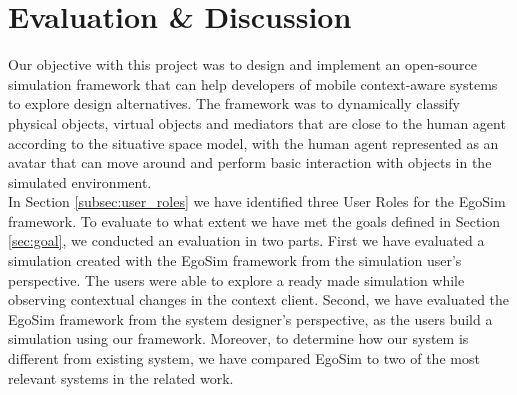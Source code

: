 \chapter{Evaluation \& Discussion}\label{ch:evaluation}
Our objective with this project was to design and implement an open-source simulation framework that can help developers of mobile context-aware systems to explore design alternatives. The framework was to dynamically classify physical objects, virtual objects and mediators that are close to the human agent according to the situative space model, with the human agent represented as an avatar that can move around and perform basic interaction with objects in the simulated environment.\\

In Section \ref{subsec:user_roles} we have identified three User Roles for the EgoSim framework. To evaluate to what extent we have met the goals defined in Section \ref{sec:goal}, we conducted an evaluation in two parts. First we have evaluated a simulation created with the EgoSim framework from the simulation user's perspective. The users were able to explore a ready made simulation while observing contextual changes in the context client. Second, we have evaluated the EgoSim framework from the system designer's perspective, as the users build a simulation using our framework. Moreover, to determine how our system is different from existing system, we have compared EgoSim to two of the most relevant systems in the related work.\\





